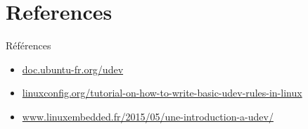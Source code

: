 \documentclass{beamer}
\begin{document}
\section{References}

 \begin{frame}
\begin{block}{Références} 
	\begin{itemize}
		[circle]
		\item \footnotesize \url{doc.ubuntu-fr.org/udev} \normalsize
		\item \footnotesize \url{linuxconfig.org/tutorial-on-how-to-write-basic-udev-rules-in-linux} \normalsize
		\item \footnotesize \url{www.linuxembedded.fr/2015/05/une-introduction-a-udev/} \normalsize
	\end{itemize}
\end{block}
\end{frame}
      
\end{document}
